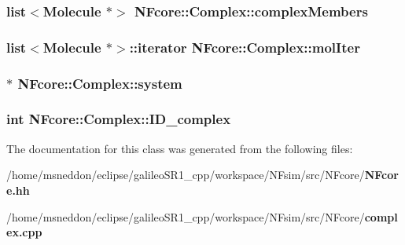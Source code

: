 \subsubsection{\setlength{\rightskip}{0pt plus 5cm}list$<${\bf Molecule} $\ast$$>$ {\bf NFcore::Complex::complexMembers}}\label{classNFcore_1_1Complex_eb6d1fcb66f1c7ae39edb701f1443024}


\subsubsection{\setlength{\rightskip}{0pt plus 5cm}list$<${\bf Molecule} $\ast$$>$::iterator {\bf NFcore::Complex::molIter}}\label{classNFcore_1_1Complex_2551a54dfa379df3bc200b729e3e35bf}


\subsubsection{$\ast$ {\bf NFcore::Complex::system}\hspace{0.3cm}{\tt  [protected]}}\label{classNFcore_1_1Complex_507911a7d8e341fe531173a178011cc3}


\subsubsection{\setlength{\rightskip}{0pt plus 5cm}int {\bf NFcore::Complex::ID\_\-complex}\hspace{0.3cm}{\tt  [protected]}}\label{classNFcore_1_1Complex_fa83ffe4d89fe79396145cf245960d9d}




The documentation for this class was generated from the following files:\begin{CompactItemize}
\item 
/home/msneddon/eclipse/galileoSR1\_\-cpp/workspace/NFsim/src/NFcore/{\bf NFcore.hh}\item 
/home/msneddon/eclipse/galileoSR1\_\-cpp/workspace/NFsim/src/NFcore/{\bf complex.cpp}\end{CompactItemize}

